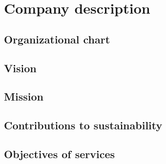 \chapter{Company description}
\section{Organizational chart}
\section{Vision}
\section{Mission}
\section{Contributions to sustainability}
\section{Objectives of services}

